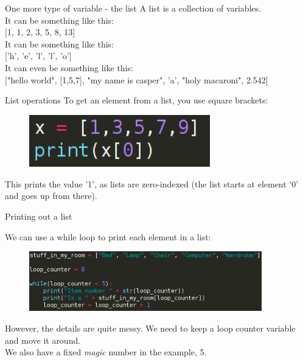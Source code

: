 \documentclass{beamer}
\begin{document}
\begin{frame}{One more type of variable - the list}
A list is a collection of variables.\\
\pause
It can be something like this:\\ \pause
{[}1, 1, 2, 3, 5, 8, 13{]}\\ \pause
It can be something like this:\\ \pause
{[}'h', 'e', 'l', 'l', 'o'{]}\\ \pause
It can even be something like this:\\ \pause
{[}"hello world", {[}1,5,7{]}, "my name is casper", 'a', "holy macaroni", 2.542{]}
\end{frame}

\begin{frame}{List operations}
To get an element from a list, you use square brackets:\\ \pause
\begin{figure}[h]
\includegraphics[width=0.7\textwidth]{squarebrack}
\end{figure}

\pause
This prints the value '1', as lists are zero-indexed (the list starts at element '0' and goes up from there).

\end{frame}


\begin{frame}{Printing out a list}

We can use a while loop to print each element in a list: \pause \\
\begin{figure}[h]
\includegraphics[width=0.9\textwidth]{roomstuff}
\end{figure}
\pause
However, the details are quite messy. We need to keep a loop counter variable and move it around.\\ \pause
We also have a fixed \textit{magic} number in the example, 5.

\end{frame}
\end{document}
